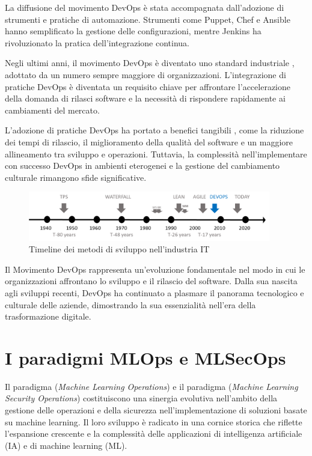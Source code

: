 La diffusione del movimento DevOps è stata accompagnata dall'adozione di strumenti e pratiche di automazione. Strumenti come Puppet, Chef e Ansible hanno semplificato la gestione delle configurazioni, mentre Jenkins ha rivoluzionato la pratica dell'integrazione continua.

Negli ultimi anni, il movimento DevOps è diventato uno standard industriale \cite{devops_1}, adottato da un numero sempre maggiore di organizzazioni. L'integrazione di pratiche DevOps è diventata un requisito chiave per affrontare l'accelerazione della domanda di rilasci software e la necessità di rispondere rapidamente ai cambiamenti del mercato.

L'adozione di pratiche DevOps ha portato a benefici tangibili \cite{devops_2}, come la riduzione dei tempi di rilascio, il miglioramento della qualità del software e un maggiore allineamento tra sviluppo e operazioni. Tuttavia, la complessità nell'implementare con successo DevOps in ambienti eterogenei e la gestione del cambiamento culturale rimangono sfide significative.

\begin{figure}[h]
    \centering
    \includegraphics[width=400px]{figures/ch1/devops-timeline.png}
    \caption[Timeline dei metodi di sviluppo nell'industria IT]{Timeline dei metodi di sviluppo nell'industria IT}
    \label{fig:cha1:from_waterfall_to_devops}
\end{figure}

Il Movimento DevOps rappresenta un'evoluzione fondamentale nel modo in cui le organizzazioni affrontano lo sviluppo e il rilascio del software. Dalla sua nascita agli sviluppi recenti, DevOps ha continuato a plasmare il panorama tecnologico e culturale delle aziende, dimostrando la sua essenzialità nell'era della trasformazione digitale.

\section{I paradigmi MLOps e MLSecOps}

Il paradigma  ({\em Machine Learning Operations}) e il paradigma  ({\em Machine Learning Security Operations}) costituiscono una sinergia evolutiva nell'ambito della gestione delle operazioni e della sicurezza nell'implementazione di soluzioni basate su machine learning. Il loro sviluppo è radicato in una cornice storica che riflette l'espansione crescente e la complessità delle applicazioni di intelligenza artificiale (IA) e di machine learning (ML).

